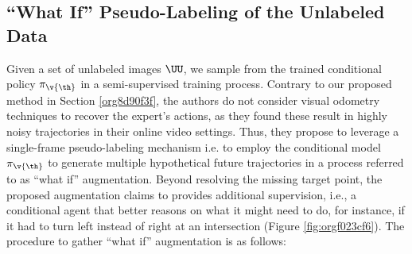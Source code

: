 \documentclass[letterpaper, 12pt]{book}
\theoremstyle{definition}
\theoremstyle{definition}
\theoremstyle{definition}
\theoremstyle{definition}
\theoremstyle{definition}
\newcommand{\vth}{\v{\th}}
\begin{document}
\subsection{``What If'' Pseudo-Labeling of the Unlabeled Data \label{org37bfa1e}}
\label{sec:orged49b2f}
Given a set of unlabeled images \(\UU\), we sample from the trained conditional
policy \(\pi_{\vth}\) in a semi-supervised training process. Contrary to our
proposed method in Section \ref{org8d90f3f}, the authors do not consider visual odometry
techniques \cite{Wang2017} to recover the expert's actions, as they found these
result in highly noisy trajectories in their online video settings. Thus, they
propose to leverage a single-frame pseudo-labeling mechanism i.e. to employ the
conditional model \(\pi_{\vth}\) to generate multiple hypothetical future
trajectories in a process referred to as ``what if'' augmentation. Beyond
resolving the missing target point, the proposed augmentation claims to provides
additional supervision, i.e., a conditional agent that better reasons on what it
might need to do, for instance, if it had to turn left instead of right at an
intersection (Figure \ref{fig:orgf023cf6}). The procedure to gather ``what if''
augmentation is as follows:
\end{document}
